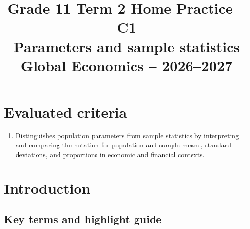 \makeatletter
{}
\makeatother




\CoordinatedTermTwoPalette
\usepackage{needspace}
\usepackage{titling}
\setlength{\droptitle}{-2em}
\pretitle{\par\begingroup\centering\LARGE}
\posttitle{\par\endgroup}
\preauthor{}\postauthor{}
\predate{}\postdate{}
\maketitlehookd{\vspace{-1em}}
\linespread{1.12}
\setlength{\parskip}{5pt}

\title{Grade 11 Term 2 Home Practice -- C1\\\large Parameters and sample statistics\\[0.25em]
	\normalsize Global Economics -- 2026--2027}
\author{}
\date{}


	\maketitle
	\vspace{-1.5\baselineskip}

	\setcounter{tocdepth}{1}
	\setcounter{secnumdepth}{2}
	\setlength{\cftbeforesecskip}{3pt}
	\label{toc}
	\tableofcontents

	\section*{Evaluated criteria}
	\begin{enumerate}[label=\textbf{C\arabic*},start=1]
		\item Distinguishes population parameters from sample statistics by interpreting and comparing the notation for population and sample means, standard deviations, and proportions in economic and financial contexts.
	\end{enumerate}

	\section{Introduction}
	\label{sec:c1-introduction}

    \subsection{Key terms and highlight guide}
    \label{subsec:c1-key-terms}
    \label{tab:highlight-legend}

